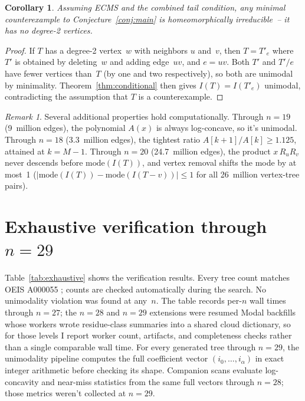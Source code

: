 \documentclass[12pt,oneside]{article}
\newtheorem{corollary}[theorem]{Corollary}
\theoremstyle{remark}
\newtheorem{remark}[theorem]{Remark}
\begin{document}
\begin{corollary}\label{cor:homirred}
  Assuming ECMS and the combined tail condition, any minimal counterexample to Conjecture~\ref{conj:main} is homeomorphically irreducible~-- it has no degree-2 vertices.
\end{corollary}

\begin{proof}
If $T$ has a degree-2 vertex~$w$ with neighbors $u$ and~$v$, then $T = T'_e$ where $T'$ is obtained by deleting~$w$ and adding edge~$uv$, and $e = uv$.
Both $T'$ and $T'/e$ have fewer vertices than~$T$ (by one and two respectively), so both are unimodal by minimality.
Theorem~\ref{thm:conditional} then gives $I(T) = I(T'_e)$ unimodal, contradicting the assumption that $T$ is a counterexample.
\end{proof}

\begin{remark}\label{rem:additional}
  Several additional properties hold computationally.
  Through $n = 19$ (9~million edges), the polynomial $A(x)$ is always log-concave, so it's unimodal.
  Through $n = 18$ (3.3~million edges), the tightest ratio $A[k{+}1]/A[k] \ge 1.125$, attained at $k = M - 1$.
  Through $n = 20$ (24.7~million edges), the product $x\, R_u R_v$ never descends before $\mathrm{mode}(I(T))$, and vertex removal shifts the mode by at most~1 ($|\mathrm{mode}(I(T)) - \mathrm{mode}(I(T{-}v))| \le 1$ for all 26~million vertex-tree pairs).
\end{remark}


\section{Exhaustive verification through \texorpdfstring{$n = 29$}{n = 29}}\label{sec:exhaustive}

Table~\ref{tab:exhaustive} shows the verification results.
Every tree count matches OEIS A000055 \citep{oeis-a000055}; counts are checked automatically during the search.
No unimodality violation was found at any~$n$.
The table records per-$n$ wall times through $n = 27$; the $n = 28$ and $n = 29$ extensions were resumed Modal backfills whose workers wrote residue-class summaries into a shared cloud dictionary, so for those levels I report worker count, artifacts, and completeness checks rather than a single comparable wall time.
For every generated tree through $n=29$, the unimodality pipeline computes the full coefficient vector $(i_0,\dots,i_{\alpha})$ in exact integer arithmetic before checking its shape.
Companion scans evaluate log-concavity and near-miss statistics from the same full vectors through $n=28$; those metrics weren't collected at $n=29$.
\end{document}
